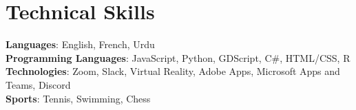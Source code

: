 \documentclass[letterpaper,11pt]{article}
\begin{document}
\section{Technical Skills}
 \begin{itemize}[leftmargin=0.15in, label={}]
    \small{\item{
     \textbf{Languages}{: English, French, Urdu} \\
     \textbf{Programming Languages}{: JavaScript, Python, GDScript, C\#, HTML/CSS, R} \\
     \textbf{Technologies}{: Zoom, Slack, Virtual Reality, Adobe Apps, Microsoft Apps and Teams, Discord }\\
        \textbf{Sports}{: Tennis, Swimming, Chess }
    }}
    
 \end{itemize}


\end{document}
